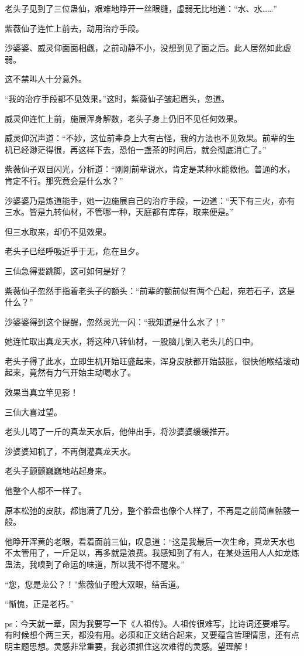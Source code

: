 \begin{this_body}
老头子见到了三位蛊仙，艰难地睁开一丝眼缝，虚弱无比地道：“水、水……”

紫薇仙子连忙上前去，动用治疗手段。

沙婆婆、威灵仰面面相觑，之前动静不小，没想到见了面之后。此人居然如此虚弱。

这不禁叫人十分意外。

“我的治疗手段都不见效果。”这时，紫薇仙子皱起眉头，忽道。

威灵仰连忙上前，施展浑身解数，老头子身上仍旧不见任何效果。

威灵仰沉声道：“不妙，这位前辈身上大有古怪，我的方法也不见效果。前辈的生机已经渺茫得很，再这样下去，恐怕一盏茶的时间后，就会彻底消亡了。”

紫薇仙子双目闪光，分析道：“刚刚前辈说水，肯定是某种水能救他。普通的水，肯定不行。那究竟会是什么水？”

沙婆婆乃是炼道能手，她一边施展自己的治疗手段，一边道：“天下有三火，亦有三水。皆是九转仙材，不管哪一种，天庭都有库存，取来便是。”

但三水取来，却仍不见效果。

老头子已经呼吸近乎于无，危在旦夕。

三仙急得要跳脚，这可如何是好？

紫薇仙子忽然手指着老头子的额头：“前辈的额前似有两个凸起，宛若石子，这是什么？”

沙婆婆得到这个提醒，忽然灵光一闪：“我知道是什么水了！”

她连忙取出真龙天水，将这种八转仙材，一股脑儿倒入老头儿的口中。

老头子得了此水，立即生机开始旺盛起来，浑身皮肤都开始鼓胀，很快他喉结滚动起来，竟然有力气开始主动喝水了。

效果当真立竿见影！

三仙大喜过望。

老头儿喝了一斤的真龙天水后，他伸出手，将沙婆婆缓缓推开。

沙婆婆知机了，不再倒灌真龙天水。

老头子颤颤巍巍地站起身来。

他整个人都不一样了。

原本松弛的皮肤，都饱满了几分，整个脸盘也像个人样了，不再是之前简直骷髅一般。

他睁开浑黄的老眼，看着面前三仙，叹息道：“这是我最后一次生命，真龙天水也不太管用了，一斤足以，再多就是浪费。我感知到了有人，在某处运用人人如龙炼蛊法，我嗅到了命运的味道，所以我不得不醒来。”

“您，您是龙公？！”紫薇仙子瞪大双眼，结舌道。

“惭愧，正是老朽。”

ps：今天就一章，因为我要写一下《人祖传》。人祖传很难写，比诗词还要难写。有时候想个两三天，都没有用。必须和正文结合起来，又要蕴含哲理情思，还有点明主题思想。灵感非常重要，我必须抓住这次难得的灵感。望理解！

\end{this_body}

